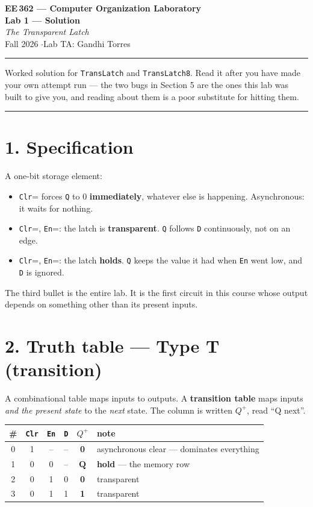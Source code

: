 \documentclass[11pt]{article}
\newcommand{\code}[1]{\texttt{#1}}
\newcommand{\hr}{\vspace{2pt}\hrule\vspace{6pt}}
\begin{document}
\begin{center}
{\Large\bfseries EE\,362 --- Computer Organization Laboratory}\\[2pt]
{\large\bfseries Lab 1 --- Solution}\\[2pt]
{\itshape The Transparent Latch}\\[4pt]
Fall 2026 \quad$\cdot$\quad Lab TA: Gandhi Torres
\end{center}
\hr

Worked solution for \code{TransLatch} and \code{TransLatch8}. Read it after you
have made your own attempt run --- the two bugs in Section 5 are the ones this lab
was built to give you, and reading about them is a poor substitute for hitting them.

\vspace{4pt}\hr

\section*{1. Specification}

A one-bit storage element:

\begin{itemize}[leftmargin=1.6em,itemsep=1pt]
\item \code{Clr}\;= forces \code{Q} to 0 \textbf{immediately}, whatever else is
happening. Asynchronous: it waits for nothing.
\item \code{Clr}\;=, \code{En}\;=: the latch is \textbf{transparent}. \code{Q}
follows \code{D} continuously, not on an edge.
\item \code{Clr}\;=, \code{En}\;=: the latch \textbf{holds}. \code{Q} keeps
the value it had when \code{En} went low, and \code{D} is ignored.
\end{itemize}

The third bullet is the entire lab. It is the first circuit in this course whose
output depends on something other than its present inputs.

\section*{2. Truth table --- Type T (transition)}

A combinational table maps inputs to outputs. A \textbf{transition table} maps
inputs \emph{and the present state} to the \emph{next} state. The column is written
$Q^{+}$, read ``Q next''.

\begin{center}
\begin{tabular}{c|ccc|c|l}
\toprule
\# & \code{Clr} & \code{En} & \code{D} & $Q^{+}$ & note \\
\midrule
0 & 1 & -- & -- & \textbf{0} & asynchronous clear --- dominates everything \\
1 & 0 & 0 & -- & $\mathbf{Q}$ & \textbf{hold} --- the memory row \\
2 & 0 & 1 & 0 & \textbf{0} & transparent \\
3 & 0 & 1 & 1 & \textbf{1} & transparent \\
\bottomrule
\end{tabular}
\end{center}
\end{document}
